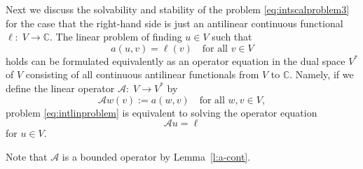 \documentclass[12pt,DIV=14]{scrartcl}
\providecommand{\C}{\mathbb{C}}
\begin{document}
Next we discuss the solvability and stability of the problem \eqref{eq:intscalproblem3}
for the case that the right-hand side is just an antilinear continuous functional
$\ell:\; V\to\C$.
The linear problem of finding $u\in V$ such that
\begin{equation}\label{eq:intlinproblem}
a(u,v) = \ell(v)
\quad\text{for all } v\in V
\end{equation}
holds can be formulated equivalently as an operator equation in the dual space $V^\ast$ of $V$
consisting of all continuous antilinear functionals from $V$ to $\C$.
Namely, if we define the linear operator $\mathcal{A}:\; V \to V^\ast$ by
\begin{equation}\label{eq:defopA}
\mathcal{A} w(v) := a(w,v)
\quad\text{for all } w, v\in V,
\end{equation}
problem \eqref{eq:intlinproblem} is equivalent to solving the operator equation
\begin{equation}\label{eq:intlinopproblem}
\mathcal{A} u = \ell
\end{equation}
for $u\in V$.

Note that $\mathcal{A}$ is a bounded operator by Lemma~\ref{l:a-cont}.
\end{document}
